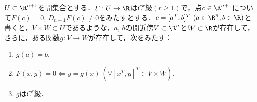 \documentclass[a4paper,10pt]{ltjsarticle}
\begin{document}
\begin{MyTheorem}
  \(U \subset \R^{n+1}\)を開集合とする．\(F: U \to \R\)は\(C^r\)級$(r \ge 1)$で，点\(c \in \R^{n+1}\)について\(F(c)=0\), \(D_{n+1}F(c) \ne 0\)をみたすとする．\(c = [a^T, b]^T \ (a \in \R^n, b \in \R)\)と書くと，\(V \times W \subset U\)であるような，\(a\), \(b\)の開近傍\(V \subset \R^n\)と\(W \subset \R\)が存在して，さらに，ある関数\(g: V \to W\)が存在して，次をみたす：
  \begin{enumerate}
    \item \(g(a) = b\).
    \item \(F(x, y) = 0 \iff y = g(x) \ (\forall [x^T, y]^T \in V \times W)\).
    \item \(g\)は\(C^r\)級．
  \end{enumerate}
\end{MyTheorem}
\end{document}
